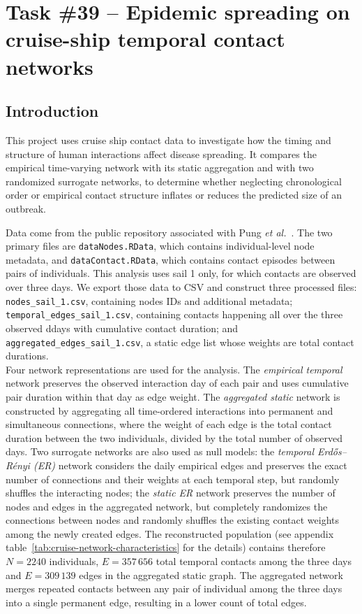 \clearpage
\chapter{Task \#39 -- \textbf{Epidemic spreading on cruise-ship temporal contact networks}}\label{chap:cruise-epidemic}

\section{Introduction}

This project uses cruise ship contact data to investigate how the timing and structure of human interactions affect disease spreading. It compares the empirical time-varying network with its static aggregation and with two randomized surrogate networks, to determine whether neglecting chronological order or empirical contact structure inflates or reduces the predicted size of an outbreak.

Data come from the public repository associated with Pung \emph{et al.}~\citep{pungCruiseNetworks}. The two primary files are \texttt{dataNodes.RData}, which contains individual-level node metadata, and \texttt{dataContact.RData}, which contains contact episodes between pairs of individuals. This analysis uses sail 1 only, for which contacts are observed over three days. 
We export those data to CSV and construct three processed files: \texttt{nodes\_sail\_1.csv}, containing nodes IDs and additional metadata; \texttt{temporal\_edges\_sail\_1.csv}, 
containing contacts happening all over the three observed ddays with cumulative contact duration; and \texttt{aggregated\_edges\_sail\_1.csv}, a static edge list whose weights are total contact durations.\\
Four network representations are used for the analysis. The \emph{empirical temporal} network preserves the observed interaction day of each pair and uses cumulative pair duration within that day as edge weight. 
The \emph{aggregated static} network is constructed by aggregating all time-ordered interactions into permanent and simultaneous connections, where the weight of each edge is the total contact duration between the two individuals, divided by the total number of observed days.
Two surrogate networks are also used as null models: the \emph{temporal Erd\H{o}s--R\'enyi (ER)} network considers the daily empirical edges and preserves the exact number of connections
 and their weights at each temporal step, but randomly shuffles the interacting nodes; the \emph{static ER} network preserves the number of nodes and edges in the aggregated network, but completely randomizes the connections between nodes and randomly shuffles the existing contact weights among the newly created edges.
The reconstructed population (see appendix table~\ref{tab:cruise-network-characteristics} for the details) contains therefore $N=2240$ individuals, $E=357\,656$ total temporal contacts among the three days and $E=309\,139$ edges in the aggregated static graph. The aggregated network merges repeated contacts between any pair of individual among the three 
days into a single permanent edge, resulting in a lower count of total edges.

